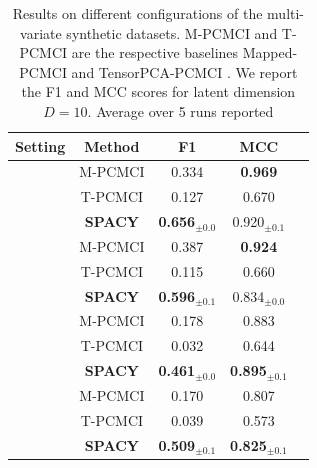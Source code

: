 



\begin{table}[!h]
\centering
\begin{tabular}{ccccc}
\toprule
\textbf{Setting} & \textbf{Method} & \textbf{F1} & \textbf{MCC}\\
\midrule
{} 
 & M-PCMCI  & 0.334 & \textbf{0.969}\\
 & T-PCMCI  & 0.127 & 0.670\\
 & \textbf{SPACY} & \textbf{0.656}$_{\pm0.0}$ & 0.920$_{\pm0.1}$\\
\midrule
{}
 & M-PCMCI & 0.387 & \textbf{0.924}\\
 & T-PCMCI & 0.115 & 0.660 \\
 & \textbf{SPACY} & \textbf{0.596}$_{\pm0.1}$ & 0.834$_{\pm0.0}$\\
 \midrule
{}
 & M-PCMCI & 0.178 & 0.883\\
 & T-PCMCI & 0.032 & 0.644 \\
 & \textbf{SPACY} & \textbf{0.461}$_{\pm0.0}$ & \textbf{0.895}$_{\pm0.1}$\\
 \midrule
{}
 & M-PCMCI & 0.170 & 0.807\\
 & T-PCMCI & 0.039 & 0.573 \\
 & \textbf{SPACY} & \textbf{0.509}$_{\pm0.1}$ & \textbf{0.825}$_{\pm0.1}$\\
\bottomrule
\end{tabular}
\caption{Results on different configurations of the multi-variate synthetic datasets. M-PCMCI and T-PCMCI are the respective baselines Mapped-PCMCI \citep{xavi2022teleconnection} and TensorPCA-PCMCI \citep{babii2023tensorprincipalcomponentanalysis}. We report the F1 and MCC scores for latent dimension $D = 10$. Average over 5 runs reported}
\label{tab:syn_multi_eval}
\end{table}